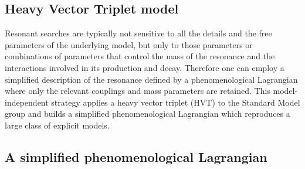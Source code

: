 \subsection{Heavy Vector Triplet model}
Resonant searches are typically not sensitive to all the details and the free parameters of the underlying model, but only to those parameters or combinations of parameters that control the mass of the resonance and the interactions involved in its production and decay. Therefore one can employ a simplified description of the resonance defined by a phenomenological Lagrangian where only the relevant couplings and mass parameters are retained. This model-independent strategy applies a heavy vector triplet (HVT)\cite{HVT} to the Standard Model group and builds a simplified phenomenological Lagrangian which reproduces a large class of explicit models. 

\subsection{A simplified phenomenological Lagrangian}
